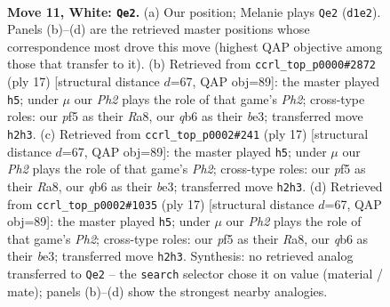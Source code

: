 \documentclass[11pt]{article}
\begin{document}
\begin{figure}[p]
\label{fig:thought-m18}
\end{figure}

\clearpage

\begin{figure}[p]\centering
\begin{subfigure}{0.46\textwidth}\centering
\resizebox{\linewidth}{!}{%
\newchessgame
\chessboard[
  setfen={r3k1nr/pp1b4/1qn1p3/2bpPppp/8/P1P2N2/1P1N1PPP/R1BQKB1R w Kkq - 0 11},
  showmover=false,
  pgfstyle=straightmove, color=movearrow, markmove={d1-e2}
]}
\caption{}
\end{subfigure}\hfill
\begin{subfigure}{0.46\textwidth}\centering
\resizebox{\linewidth}{!}{%
\newchessgame
\chessboard[
  setfen={r1bqkb1r/3n1ppp/p2ppn2/1p6/3NP3/P1N1BP2/1PPQ2PP/R3KB1R b KQkq - 0 9},
  showmover=false,
  pgfstyle=straightmove, color=movearrow, markmove={h7-h5}
]}
\caption{}
\end{subfigure}
\\[4pt]
\begin{subfigure}{0.46\textwidth}\centering
\resizebox{\linewidth}{!}{%
\newchessgame
\chessboard[
  setfen={r1bqkb1r/3n1ppp/p2ppn2/1p6/3NP3/P1N1BP2/1PPQ2PP/R3KB1R b KQkq - 0 9},
  showmover=false,
  pgfstyle=straightmove, color=movearrow, markmove={h7-h5}
]}
\caption{}
\end{subfigure}\hfill
\begin{subfigure}{0.46\textwidth}\centering
\resizebox{\linewidth}{!}{%
\newchessgame
\chessboard[
  setfen={r1bqkb1r/3n1ppp/p2ppn2/1p6/3NP3/P1N1BP2/1PPQ2PP/R3KB1R b KQkq - 0 9},
  showmover=false,
  pgfstyle=straightmove, color=movearrow, markmove={h7-h5}
]}
\caption{}
\end{subfigure}
\caption{\textbf{Move 11, White: \texttt{Qe2}.} (a) Our position; Melanie plays \texttt{Qe2} (\texttt{d1e2}). Panels (b)--(d) are the retrieved master positions whose correspondence most drove this move (highest QAP objective among those that transfer to it). (b) Retrieved from \texttt{ccrl\_top\_p0000\#2872} (ply 17) [structural distance $d$=67, QAP obj=89]: the master played \texttt{h5}; under $\mu$ our \emph{Ph2} plays the role of that game's \emph{Ph2}; cross-type roles: our \emph{p}f5 as their \emph{R}a8, our \emph{q}b6 as their \emph{b}e3; transferred move \texttt{h2h3}. (c) Retrieved from \texttt{ccrl\_top\_p0002\#241} (ply 17) [structural distance $d$=67, QAP obj=89]: the master played \texttt{h5}; under $\mu$ our \emph{Ph2} plays the role of that game's \emph{Ph2}; cross-type roles: our \emph{p}f5 as their \emph{R}a8, our \emph{q}b6 as their \emph{b}e3; transferred move \texttt{h2h3}. (d) Retrieved from \texttt{ccrl\_top\_p0002\#1035} (ply 17) [structural distance $d$=67, QAP obj=89]: the master played \texttt{h5}; under $\mu$ our \emph{Ph2} plays the role of that game's \emph{Ph2}; cross-type roles: our \emph{p}f5 as their \emph{R}a8, our \emph{q}b6 as their \emph{b}e3; transferred move \texttt{h2h3}. Synthesis: no retrieved analog transferred to \texttt{Qe2} -- the \texttt{search} selector chose it on value (material / mate); panels (b)--(d) show the strongest nearby analogies.}
\label{fig:thought-m20}
\end{figure}
\end{document}
